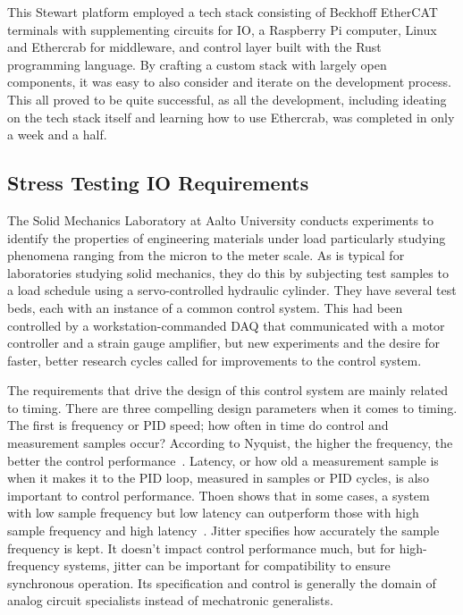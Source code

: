 \documentclass[english,12pt,a4paper,pdftex,eng,utf8]{aaltothesis}
\begin{document}
This Stewart platform employed a tech stack consisting of Beckhoff EtherCAT terminals with supplementing circuits for IO, a Raspberry Pi computer, Linux and Ethercrab for middleware, and control layer built with the Rust programming language.  By crafting a custom stack with largely open components, it was easy to also consider and iterate on the development process.  This all proved to be quite successful, as all the development, including ideating on the tech stack itself and learning how to use Ethercrab, was completed in only a week and a half.

\subsection{Stress Testing IO Requirements}

The Solid Mechanics Laboratory at Aalto University conducts experiments to identify the properties of engineering materials under load particularly studying phenomena ranging from the micron to the meter scale.  As is typical for laboratories studying solid mechanics, they do this by subjecting test samples to a load schedule using a servo-controlled hydraulic cylinder.  They have several test beds, each with an instance of a common control system.  This had been controlled by a workstation-commanded DAQ that communicated with a motor controller and a strain gauge amplifier, but new experiments and the desire for faster, better research cycles called for improvements to the control system.

The requirements that drive the design of this control system are mainly related to timing.  There are three compelling design parameters when it comes to timing.  The first is frequency or PID speed; how often in time do control and measurement samples occur?  According to Nyquist, the higher the frequency, the better the control performance~\cite{Nyquist1928}.  Latency, or how old a measurement sample is when it makes it to the PID loop, measured in samples or PID cycles, is also important to control performance.  Thoen shows that in some cases, a system with low sample frequency but low latency can outperform those with high sample frequency and high latency~\cite{Thoen2021}.  Jitter specifies how accurately the sample frequency is kept.  It doesn't impact control performance much, but for high-frequency systems, jitter can be important for compatibility to ensure synchronous operation.  Its specification and control is generally the domain of analog circuit specialists instead of mechatronic generalists.
\end{document}
